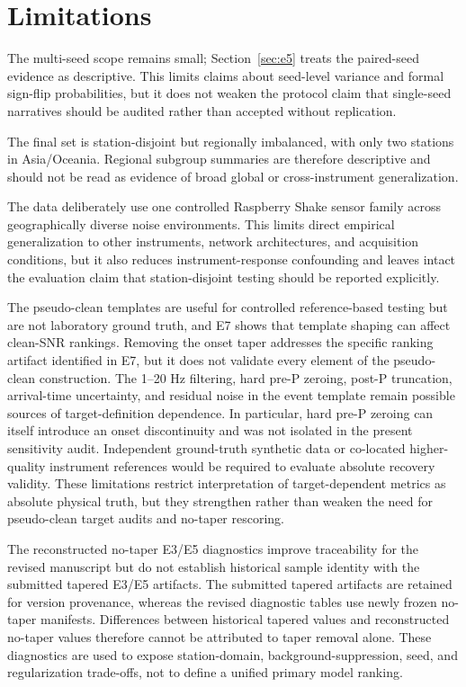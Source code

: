 \documentclass[review,12pt,authoryear]{elsarticle}
\begin{document}
\section{Limitations}
The multi-seed scope remains small; Section~\ref{sec:e5} treats the paired-seed evidence as descriptive. This limits claims about seed-level variance and formal sign-flip probabilities, but it does not weaken the protocol claim that single-seed narratives should be audited rather than accepted without replication.

The final set is station-disjoint but regionally imbalanced, with only two stations in Asia/Oceania. Regional subgroup summaries are therefore descriptive and should not be read as evidence of broad global or cross-instrument generalization.

The data deliberately use one controlled Raspberry Shake sensor family across geographically diverse noise environments. This limits direct empirical generalization to other instruments, network architectures, and acquisition conditions, but it also reduces instrument-response confounding and leaves intact the evaluation claim that station-disjoint testing should be reported explicitly.

The pseudo-clean templates are useful for controlled reference-based testing but are not laboratory ground truth, and E7 shows that template shaping can affect clean-SNR rankings. Removing the onset taper addresses the specific ranking artifact identified in E7, but it does not validate every element of the pseudo-clean construction. The 1--20 Hz filtering, hard pre-P zeroing, post-P truncation, arrival-time uncertainty, and residual noise in the event template remain possible sources of target-definition dependence. In particular, hard pre-P zeroing can itself introduce an onset discontinuity and was not isolated in the present sensitivity audit. Independent ground-truth synthetic data or co-located higher-quality instrument references would be required to evaluate absolute recovery validity. These limitations restrict interpretation of target-dependent metrics as absolute physical truth, but they strengthen rather than weaken the need for pseudo-clean target audits and no-taper rescoring.

The reconstructed no-taper E3/E5 diagnostics improve traceability for the revised manuscript but do not establish historical sample identity with the submitted tapered E3/E5 artifacts. The submitted tapered artifacts are retained for version provenance, whereas the revised diagnostic tables use newly frozen no-taper manifests. Differences between historical tapered values and reconstructed no-taper values therefore cannot be attributed to taper removal alone. These diagnostics are used to expose station-domain, background-suppression, seed, and regularization trade-offs, not to define a unified primary model ranking.
\end{document}
